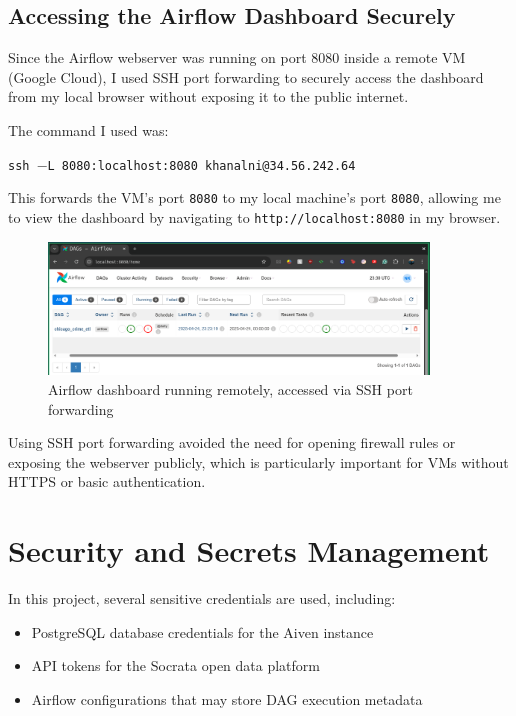 \documentclass[12pt]{article}
\begin{document}
\subsection*{Accessing the Airflow Dashboard Securely}

Since the Airflow webserver was running on port 8080 inside a remote VM (Google Cloud), I used SSH port forwarding to securely access the dashboard from my local browser without exposing it to the public internet.

The command I used was:

\texttt{ssh $-$L 8080:localhost:8080 khanalni@34.56.242.64}

This forwards the VM’s port \texttt{8080} to my local machine’s port \texttt{8080}, allowing me to view the dashboard by navigating to \texttt{http://localhost:8080} in my browser.

\begin{figure}[h!]
    \centering
    \includegraphics[width=0.9\textwidth]{figures/airflow_dashboard_ui.png}
    \caption{Airflow dashboard running remotely, accessed via SSH port forwarding}
    \label{fig:airflow_ui}
\end{figure}

Using SSH port forwarding avoided the need for opening firewall rules or exposing the webserver publicly, which is particularly important for VMs without HTTPS or basic authentication.


\section{Security and Secrets Management}

In this project, several sensitive credentials are used, including:
\begin{itemize}
    \item PostgreSQL database credentials for the Aiven instance
    \item API tokens for the Socrata open data platform
    \item Airflow configurations that may store DAG execution metadata
\end{itemize}
\end{document}
